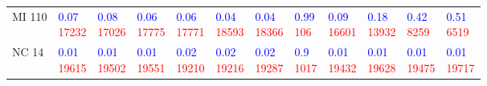 \begin{tabular}{llllllllllll}
MI 110 & \makecell{\textcolor{blue}{0.07} \\ \textcolor{red}{17232}} & \makecell{\textcolor{blue}{0.08} \\ \textcolor{red}{17026}} & \makecell{\textcolor{blue}{0.06} \\ \textcolor{red}{17775}} & \makecell{\textcolor{blue}{0.06} \\ \textcolor{red}{17771}} & \makecell{\textcolor{blue}{0.04} \\ \textcolor{red}{18593}} & \makecell{\textcolor{blue}{0.04} \\ \textcolor{red}{18366}} & \makecell{\textcolor{blue}{0.99} \\ \textcolor{red}{106}} & \makecell{\textcolor{blue}{0.09} \\ \textcolor{red}{16601}} & \makecell{\textcolor{blue}{0.18} \\ \textcolor{red}{13932}} & \makecell{\textcolor{blue}{0.42} \\ \textcolor{red}{8259}} & \makecell{\textcolor{blue}{0.51} \\ \textcolor{red}{6519}} \\
NC 14 & \makecell{\textcolor{blue}{0.01} \\ \textcolor{red}{19615}} & \makecell{\textcolor{blue}{0.01} \\ \textcolor{red}{19502}} & \makecell{\textcolor{blue}{0.01} \\ \textcolor{red}{19551}} & \makecell{\textcolor{blue}{0.02} \\ \textcolor{red}{19210}} & \makecell{\textcolor{blue}{0.02} \\ \textcolor{red}{19216}} & \makecell{\textcolor{blue}{0.02} \\ \textcolor{red}{19287}} & \makecell{\textcolor{blue}{0.9} \\ \textcolor{red}{1017}} & \makecell{\textcolor{blue}{0.01} \\ \textcolor{red}{19432}} & \makecell{\textcolor{blue}{0.01} \\ \textcolor{red}{19628}} & \makecell{\textcolor{blue}{0.01} \\ \textcolor{red}{19475}} & \makecell{\textcolor{blue}{0.01} \\ \textcolor{red}{19717}} \\

\end{tabular}
